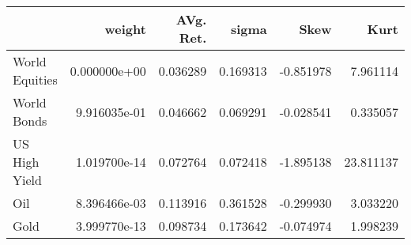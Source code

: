 \begin{tabular}{lrrrrr}
\toprule
{} &        weight &  AVg. Ret. &     sigma &      Skew &       Kurt \\
\midrule
World Equities &  0.000000e+00 &   0.036289 &  0.169313 & -0.851978 &   7.961114 \\
World Bonds    &  9.916035e-01 &   0.046662 &  0.069291 & -0.028541 &   0.335057 \\
US High Yield  &  1.019700e-14 &   0.072764 &  0.072418 & -1.895138 &  23.811137 \\
Oil            &  8.396466e-03 &   0.113916 &  0.361528 & -0.299930 &   3.033220 \\
Gold           &  3.999770e-13 &   0.098734 &  0.173642 & -0.074974 &   1.998239 \\
\bottomrule
\end{tabular}
